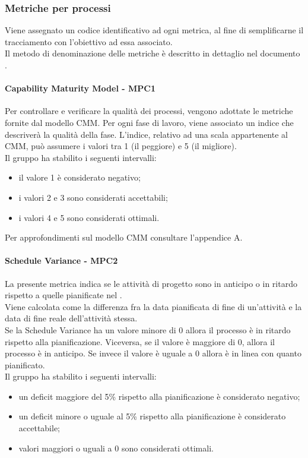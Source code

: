 \documentclass[PianoDiQualifica.tex]{subfiles}
\begin{document}
		\subsubsection{Metriche per processi}
		Viene assegnato un codice identificativo ad ogni metrica, al fine di semplificarne il tracciamento con l'obiettivo ad essa associato. \\
		Il metodo di denominazione delle metriche è descritto in dettaglio nel documento \NPdocRR{}.
		
			\hypertarget{CMM_m}{\paragraph{Capability Maturity Model - MPC1}}
			Per controllare e verificare la qualità dei processi, vengono adottate le metriche fornite dal modello CMM.
			Per ogni fase di lavoro, viene associato un indice che descriverà la qualità della fase.
			L'indice, relativo ad una scala appartenente al CMM, può assumere i valori tra 1 (il peggiore) e 5 (il migliore). \\
			Il gruppo ha stabilito i seguenti intervalli:
			\begin{itemize}
				\item il valore 1 è considerato negativo;
				\item i valori 2 e 3 sono considerati accettabili;
				\item i valori 4 e 5 sono considerati ottimali.
			\end{itemize}
			Per approfondimenti sul modello CMM consultare l'appendice A.
			
			\hypertarget{Schedule_m}{\paragraph{Schedule Variance - MPC2}}
			La presente metrica indica se le attività di progetto sono in anticipo o in ritardo rispetto a quelle pianificate nel \PPdocRR{}. \\
			Viene calcolata come la differenza fra la data pianificata di fine di un’attività e la data di fine reale dell’attività stessa. \\
			Se la Schedule Variance ha un valore minore di 0 allora il processo è in ritardo rispetto alla pianificazione. Viceversa, se il valore è maggiore di 0, allora il processo è
			in anticipo. Se invece il valore è uguale a 0 allora è in linea con quanto pianificato. \\
			Il gruppo ha stabilito i seguenti intervalli:
			\begin{itemize}
				\item un deficit maggiore del 5\% rispetto alla pianificazione è considerato negativo;
				\item un deficit minore o uguale al 5\% rispetto alla pianificazione è considerato accettabile;
				\item valori maggiori o uguali a 0 sono considerati ottimali.
			\end{itemize}
			
\end{document}
